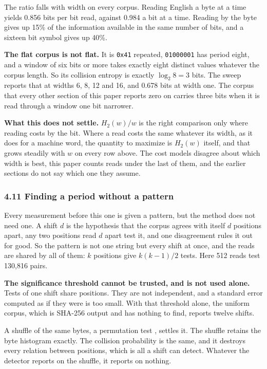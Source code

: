 The ratio falls with width on every corpus. Reading English a byte at a time yields 0.856 bits per bit read, against 0.984 a bit at a time. Reading by the byte gives up 15\% of the information available in the same number of bits, and a sixteen bit symbol gives up 40\%.

\noindent\textbf{The flat corpus is not flat.} It is \texttt{0x41} repeated, \texttt{01000001} has period eight, and a window of six bits or more takes exactly eight distinct values whatever the corpus length. So its collision entropy is exactly \(\log_2 8 = 3\) bits. The sweep reports that at widths 6, 8, 12 and 16, and 0.678 bits at width one. The corpus that every other section of this paper reports zero on carries three bits when it is read through a window one bit narrower.

\noindent\textbf{What this does not settle.} \(H_2(w)/w\) is the right comparison only where reading costs by the bit. Where a read costs the same whatever its width, as it does for a machine word, the quantity to maximize is \(H_2(w)\) itself, and that grows steadily with \(w\) on every row above. The cost models disagree about which width is best, this paper counts reads under the last of them, and the earlier sections do not say which one they assume.

\subsubsection{4.11 Finding a period without a pattern}

Every measurement before this one is given a pattern, but the method does not need one. A shift \(d\) is the hypothesis that the corpus agrees with itself \(d\) positions apart, any two positions read \(d\) apart test it, and one disagreement rules it out for good. So the pattern is not one string but every shift at once, and the reads are shared by all of them: \(k\) positions give \(k(k-1)/2\) tests. Here 512 reads test 130,816 pairs.

\noindent\textbf{The significance threshold cannot be trusted, and is not used alone.} Tests of one shift share positions. They are not independent, and a standard error computed as if they were is too small. With that threshold alone, the uniform corpus, which is SHA-256 output and has nothing to find, reports twelve shifts.

A shuffle of the same bytes, a permutation test \cite{src:Good-2005}, settles it. The shuffle retains the byte histogram exactly. The collision probability is the same, and it destroys every relation between positions, which is all a shift can detect. Whatever the detector reports on the shuffle, it reports on nothing.

